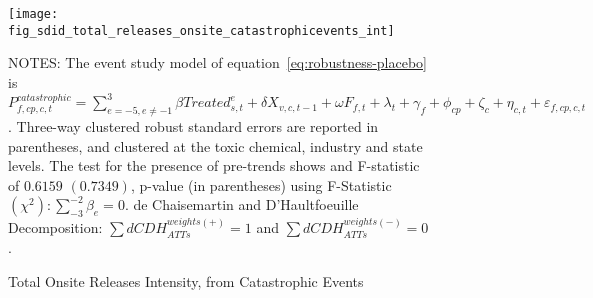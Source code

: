 \begin{figure}[H]
    \centering
    \texttt{[image: fig\_sdid\_total\_releases\_onsite\_catastrophicevents\_int]}
    \caption{Total Onsite Releases Intensity, from Catastrophic Events}
    \label{fig:baseline-placebo}
    \begin{minipage}{18cm}
        \vspace{0.05in}
        NOTES: The event study model of equation~\ref{eq:robustness-placebo} is $P_{f,cp,c,t}^{catastrophic} = \sum_{{e = -5},{e \neq -1}}^{3}\beta Treated_{s,t}^e + \delta X_{v,c,t-1} + \omega F_{f,t} + \lambda_{t} + \gamma_{f} + \phi_{cp} + \zeta_{c} + \eta_{c,t} + \varepsilon_{f,cp,c,t}$. Three-way clustered robust standard errors are reported in parentheses, and clustered at the toxic chemical, industry and state levels. The test for the presence of pre-trends shows and F-statistic of $0.6159$ $(0.7349)$, p-value (in parentheses) using F-Statistic $(\chi^2): \sum_{-3}^{-2} \beta_{e} = 0$. de Chaisemartin and D'Haultfoeuille Decomposition: $\sum dCDH_{ATTs}^{weights(+)} = 1$ and $\sum dCDH_{ATTs}^{weights(-)} = 0$.
    \end{minipage}
\end{figure}
